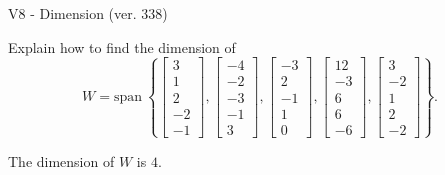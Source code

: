 \begin{exercise}
  \begin{exerciseTitle}V8 - Dimension (ver. 338)\end{exerciseTitle}
  \begin{exerciseStatement}
    Explain how to find the dimension of 
\[W=\mathrm{span}\ \left\{\left[\begin{array}{r}
3 \\
1 \\
2 \\
-2 \\
-1
\end{array}\right] , \left[\begin{array}{r}
-4 \\
-2 \\
-3 \\
-1 \\
3
\end{array}\right] , \left[\begin{array}{r}
-3 \\
2 \\
-1 \\
1 \\
0
\end{array}\right] , \left[\begin{array}{r}
12 \\
-3 \\
6 \\
6 \\
-6
\end{array}\right] , \left[\begin{array}{r}
3 \\
-2 \\
1 \\
2 \\
-2
\end{array}\right]\right\}.\]



  \end{exerciseStatement}
  \begin{exerciseAnswer}
   The dimension of \(W\) is  \(4\).
  


  \end{exerciseAnswer}
\end{exercise}
